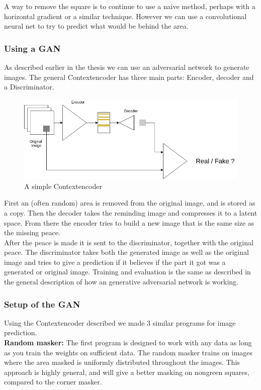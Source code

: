   A way to remove the square is to continue to use a naive method, perhaps with a horizontal gradient or a similar technique. 
  However we can use a convolutional neural net to try to predict what would be behind the area. 
  
  \subsubsection{Using a GAN}
  As described earlier in the thesis %
  we can use an adversarial network to generate images. 
  The general Contextencoder has three main parts: Encoder, decoder and a Discriminator.
  
  \begin{figure}[h]
    \centering
    \includegraphics[scale=0.5]{methods/figures/Contextencoder.png}
    \caption{A simple Contextencoder}
  \end{figure}
  
  First an (often random) area is removed from the original image, and is stored as a copy. Then the decoder takes the reminding image and compresses it to a latent space. From there 
  the encoder tries to build a new image that is the same size as the missing peace. \\
  After the peace is made it is sent to the discriminator, together with the original peace. The discriminator takes both the generated image as well as the original image and tries to give a prediction if it
  believes if the part it got was a generated or original image.
  Training and evaluation is the same as described in the general description of how an generative adversarial network is working.
  
  \subsubsection{Setup of the GAN}
  Using the Contextencoder described we made 3 %
  similar programs for image prediction.\\
  \vspace{5px}
  \textbf{Random masker:} The first program is designed to work with any data as long as you train the weights on sufficient data. The random masker trains on images where the area masked is 
  uniformly distributed throughout the images. This approach is highly general, and will give a better masking on nongreen squares, compared to the corner masker.  
  
